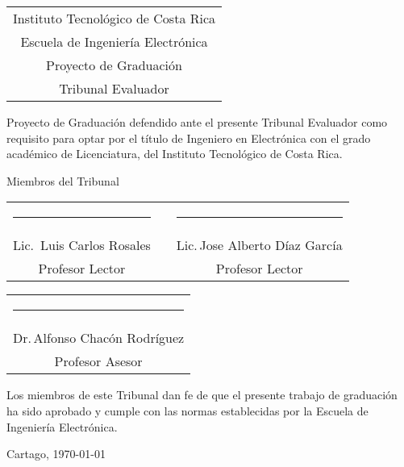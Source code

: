 \thispagestyle{empty}

\newcommand{\lectorI}{Lic.\, Luis Carlos Rosales}
\newcommand{\lectorII}{Lic.\,Jose Alberto Díaz García}
\newcommand{\director}{Dr.\,Alfonso Chacón Rodríguez}


\begin{center}
  \begin{tabular}{c}
    Instituto Tecnológico de Costa Rica \\
    Escuela de Ingeniería Electrónica \\
    Proyecto de Graduación \\
    Tribunal Evaluador
  \end{tabular}
\end{center}

\vfill

Proyecto de Graduación defendido ante el presente Tribunal Evaluador como 
requisito para optar por el título de Ingeniero en Electrónica con el grado 
académico de Licenciatura, del Instituto Tecnológico de Costa Rica.  

\vfill

\vspace*{20mm}
\begin{center}
 Miembros del Tribunal
\end{center}
\vspace*{8mm}

\vfill

\begin{center}
  \begin{tabular}{ccc}
    \rule{70mm}{0.5pt} & \rule{15mm}{0pt} & \rule{70mm}{0.5pt} \\
    \lectorI && \lectorII \\
    Profesor Lector && Profesor Lector
  \end{tabular}
  
  \vspace{10mm}

  \begin{tabular}{c}
    \rule{6cm}{0.5pt} \\
    \director \\
    Profesor Asesor
  \end{tabular}
\end{center}

\vfill


Los miembros de este Tribunal dan fe de que el presente trabajo de graduación
ha sido aprobado y cumple con las normas establecidas por la Escuela de
Ingeniería Electrónica.

\vfill

\begin{center}
  Cartago, \today \par
\end{center}

\cleardoublepage

